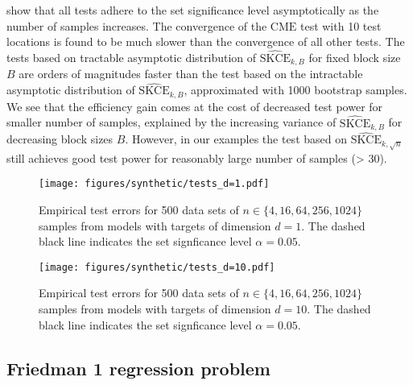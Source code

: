 \documentclass{article}
\begin{document}
 show that all tests adhere to the set
significance level asymptotically as the number of samples increases. The convergence of
the $\mathrm{CME}$ test with 10 test locations is found to be much slower than the convergence
of all other tests.
The tests based on tractable asymptotic distribution of $\widehat{\mathrm{SKCE}}_{k,B}$ for
fixed block size $B$ are orders of magnitudes faster than the test based on the intractable
asymptotic distribution of $\widehat{\mathrm{SKCE}}_{k,B}$, approximated with 1000 bootstrap
samples. We see that the efficiency gain comes at the cost of decreased test power for smaller
number of samples, explained by the increasing variance of $\widehat{\mathrm{SKCE}}_{k,B}$ for
decreasing block sizes $B$.
However, in our examples the test based on $\widehat{\mathrm{SKCE}}_{k,\sqrt{n}}$
still achieves good test power for reasonably large number of samples (> 30).

\begin{figure}[hpt]
    \begin{center}
        \texttt{[image: figures/synthetic/tests\_d=1.pdf]}
        \caption{Empirical test errors for 500 data sets of $n \in \{4, 16, 64, 256, 1024\}$
        samples from models with targets of dimension $d = 1$. The dashed black line
        indicates the set signficance level $\alpha = 0.05$.}
        \label{fig:synthetic_tests_1}
    \end{center}
\end{figure}

\begin{figure}[hpt]
    \begin{center}
        \texttt{[image: figures/synthetic/tests\_d=10.pdf]}
        \caption{Empirical test errors for 500 data sets of $n \in \{4, 16, 64, 256, 1024\}$
        samples from models with targets of dimension $d = 10$. The dashed black line
        indicates the set signficance level $\alpha = 0.05$.}
        \label{fig:synthetic_tests_10}
    \end{center}
\end{figure}

\clearpage

\subsection{Friedman 1 regression problem}
\end{document}
